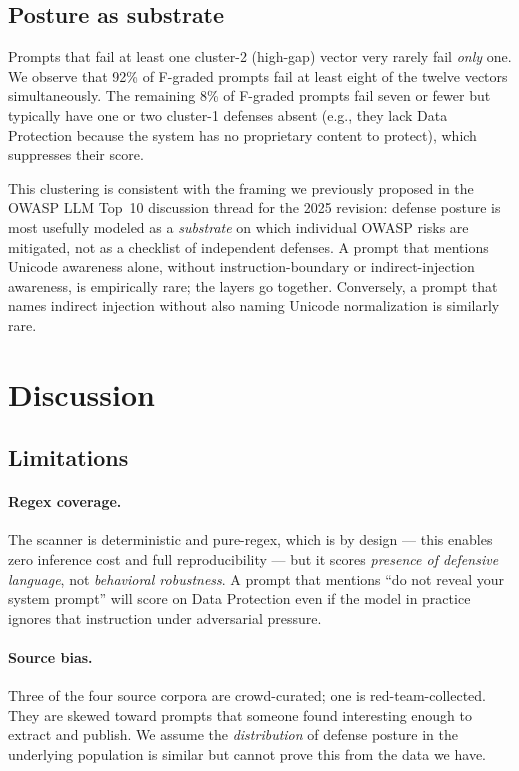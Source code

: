 \documentclass[10pt,letterpaper]{article}
\begin{document}
\subsection{Posture as substrate}\label{sec:posture}
Prompts that fail at least one cluster-2 (high-gap) vector very
rarely fail \emph{only} one. We observe that 92\% of F-graded prompts
fail at least eight of the twelve vectors simultaneously. The
remaining 8\% of F-graded prompts fail seven or fewer but typically
have one or two cluster-1 defenses absent (e.g., they lack Data
Protection because the system has no proprietary content to protect),
which suppresses their score.

This clustering is consistent with the framing we previously
proposed in the OWASP LLM Top~10 discussion thread for the 2025
revision\cite{asi-tracker-2025}: defense posture is most usefully
modeled as a \emph{substrate} on which individual OWASP risks are
mitigated, not as a checklist of independent defenses. A prompt that
mentions Unicode awareness alone, without instruction-boundary or
indirect-injection awareness, is empirically rare; the layers go
together. Conversely, a prompt that names indirect injection without
also naming Unicode normalization is similarly rare.

\section{Discussion}

\subsection{Limitations}
\paragraph{Regex coverage.} The scanner is deterministic and pure-regex, which is by
design --- this enables zero inference cost and full reproducibility ---
but it scores \emph{presence of defensive language}, not
\emph{behavioral robustness}. A prompt that mentions ``do not reveal
your system prompt'' will score on Data Protection even if the model
in practice ignores that instruction under adversarial pressure.

\paragraph{Source bias.} Three of the four source corpora are
crowd-curated; one is red-team-collected. They are skewed toward
prompts that someone found interesting enough to extract and
publish. We assume the \emph{distribution} of defense posture in the
underlying population is similar but cannot prove this from the data
we have.
\end{document}
